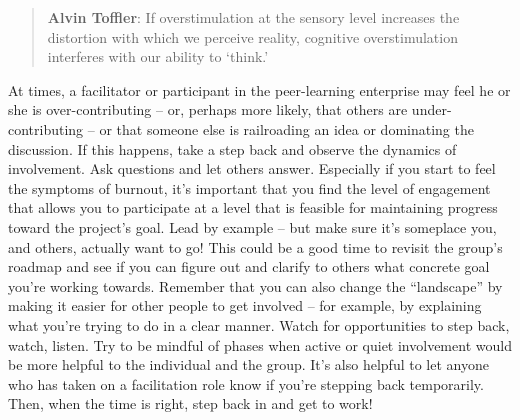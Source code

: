 \begin{quote}
\textbf{Alvin Toffler}: If overstimulation at the sensory level
increases the distortion with which we perceive reality, cognitive
overstimulation interferes with our ability to `think.'
\end{quote}


At times, a facilitator or participant in the peer-learning enterprise
may feel he or she is over-contributing -- or, perhaps more likely, that
others are under-contributing -- or that someone else is railroading an
idea or dominating the discussion. If this happens, take a step back and
observe the dynamics of involvement. Ask questions and let others
answer. Especially if you start to feel the symptoms of burnout, it's
important that you find the level of engagement that allows you to
participate at a level that is feasible for maintaining progress toward
the project's goal. Lead by example -- but make sure it's someplace you,
and others, actually want to go! This could be a good time to revisit
the group's roadmap and see if you can figure out and clarify to others
what concrete goal you're working towards. Remember that you can also
change the ``landscape'' by making it easier for other people to get
involved -- for example, by explaining what you're trying to do in a
clear manner. Watch for opportunities to step back, watch, listen. Try
to be mindful of phases when active or quiet involvement would be more
helpful to the individual and the group. It's also helpful to let anyone
who has taken on a facilitation role know if you're stepping back
temporarily. Then, when the time is right, step back in and get to work!
